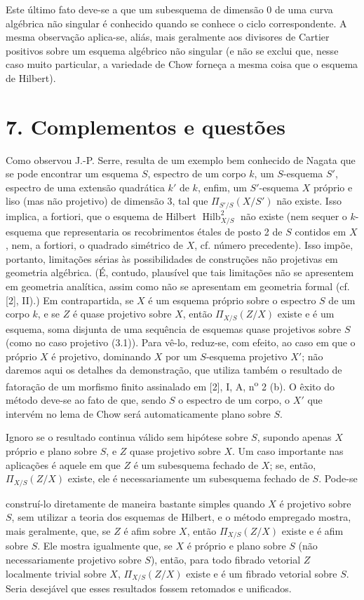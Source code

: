 \documentclass[11pt,twoside,openany]{book}
\numberwithin{equation}{section}
\newcommand{\src}[1]{%
  \phantomsection\hypertarget{src:#1}{}%
  \marginpar{\raggedleft\footnotesize\sffamily #1}%
}
\theoremstyle{plain}
\theoremstyle{definition}
\theoremstyle{remark}
\newcommand{\fsection}[2]{%
  \section*{#1. #2}%
  \addcontentsline{toc}{section}{#1. #2}%
}
\newcommand{\FgaUnitKey}{frontmatter}
\renewcommand{\src}[1]{%
  \phantomsection\hypertarget{src:\FgaUnitKey:#1}{}%
  \marginpar{\raggedleft\footnotesize\sffamily #1}%
}
\begin{document}
Este último fato deve-se a que um subesquema de dimensão 0 de uma curva
algébrica não singular é conhecido quando se conhece o ciclo correspondente.
A mesma observação aplica-se, aliás, mais geralmente aos divisores de Cartier
positivos sobre um esquema algébrico não singular (e não se exclui que, nesse
caso muito particular, a variedade de Chow forneça a mesma coisa que o esquema
de Hilbert).

\fsection{7}{Complementos e questões}

Como observou J.-P. Serre, resulta de um exemplo bem conhecido de Nagata que se
pode encontrar um esquema $S$, espectro de um corpo $k$, um $S$-esquema $S'$,
espectro de uma extensão quadrática $k'$ de $k$, enfim, um $S'$-esquema $X$
próprio e liso (mas não projetivo) de dimensão 3, tal que
$\Pi_{S'/S}(X/S')$ não existe. Isso implica, a fortiori, que o esquema de
Hilbert $\operatorname{Hilb}^2_{X/S}$ não existe (nem sequer o $k$-esquema que
representaria os recobrimentos étales de posto 2 de $S$ contidos em $X$, nem,
a fortiori, o quadrado simétrico de $X$, cf. número precedente). Isso impõe,
portanto, limitações sérias às possibilidades de construções não projetivas em
geometria algébrica. (É, contudo, plausível que tais limitações não se
apresentem em geometria analítica, assim como não se apresentam em geometria
formal (cf. [2], II).) Em contrapartida, se $X$ é um esquema próprio sobre o
espectro $S$ de um corpo $k$, e se $Z$ é quase projetivo sobre $X$, então
$\Pi_{X/S}(Z/X)$ existe e é um esquema, soma disjunta de uma sequência de
esquemas quase projetivos sobre $S$ (como no caso projetivo (3.1)). Para vê-lo,
reduz-se, com efeito, ao caso em que o próprio $X$ é projetivo, dominando $X$
por um $S$-esquema projetivo $X'$; não daremos aqui os detalhes da demonstração,
que utiliza também o resultado de fatoração de um morfismo finito assinalado em
[2], I, A, n\textsuperscript{o} 2 (b). O êxito do método deve-se ao fato de que,
sendo $S$ o espectro de um corpo, o $X'$ que intervém no lema de Chow será
automaticamente plano sobre $S$.

Ignoro se o resultado continua válido sem hipótese sobre $S$, supondo apenas
$X$ próprio e plano sobre $S$, e $Z$ quase projetivo sobre $X$. Um caso
importante nas aplicações é aquele em que $Z$ é um subesquema fechado de $X$;
se, então, $\Pi_{X/S}(Z/X)$ existe, ele é necessariamente um subesquema fechado
de $S$. Pode-se
\src{276}
construí-lo diretamente de maneira bastante simples quando $X$ é projetivo
sobre $S$, sem utilizar a teoria dos esquemas de Hilbert, e o método empregado
mostra, mais geralmente, que, se $Z$ é afim sobre $X$, então
$\Pi_{X/S}(Z/X)$ existe e é afim sobre $S$. Ele mostra igualmente que, se $X$
é próprio e plano sobre $S$ (não necessariamente projetivo sobre $S$), então,
para todo fibrado vetorial $Z$ localmente trivial sobre $X$,
$\Pi_{X/S}(Z/X)$ existe e é um fibrado vetorial sobre $S$. Seria desejável que
esses resultados fossem retomados e unificados.
\end{document}

